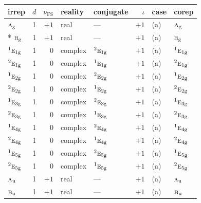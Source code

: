 \documentclass[10pt,a4paper]{article}
\numberwithin{equation}{section}
\newcommand{\irr}[1]{\text{\normalfont\scshape #1}}
\newcommand{\conjpair}[1]{{}^{#1}}
\newcommand{\ptag}[1]{\mathrm{#1}}
\newcommand{\fsind}{\nu_{\mathrm{FS}}}
\begin{document}
{\small\renewcommand{\arraystretch}{1.25}\setlength{\tabcolsep}{4pt}\begin{longtable}{@{}lrrllrll@{}}\toprule
irrep & $d$ & $\fsind$ & reality & conjugate & $\iota$ & case & corep\\\midrule\endhead
\bottomrule\endfoot\endlastfoot
$\irr{a}_{\ptag{g}}$ & 1 & $+1$ & real & --- & $+1$ & (a) & $\irr{a}_{\ptag{g}}$\\*
$\irr{b}_{\ptag{g}}$ & 1 & $+1$ & real & --- & $+1$ & (a) & $\irr{b}_{\ptag{g}}$\\
$\conjpair{1}\irr{e}_{1\ptag{g}}$ & 1 & $0$ & complex & $\conjpair{2}\irr{e}_{1\ptag{g}}$ & $+1$ & (a) & $\conjpair{1}\irr{e}_{1\ptag{g}}$\\
$\conjpair{2}\irr{e}_{1\ptag{g}}$ & 1 & $0$ & complex & $\conjpair{1}\irr{e}_{1\ptag{g}}$ & $+1$ & (a) & $\conjpair{2}\irr{e}_{1\ptag{g}}$\\
$\conjpair{1}\irr{e}_{2\ptag{g}}$ & 1 & $0$ & complex & $\conjpair{2}\irr{e}_{2\ptag{g}}$ & $+1$ & (a) & $\conjpair{1}\irr{e}_{2\ptag{g}}$\\
$\conjpair{2}\irr{e}_{2\ptag{g}}$ & 1 & $0$ & complex & $\conjpair{1}\irr{e}_{2\ptag{g}}$ & $+1$ & (a) & $\conjpair{2}\irr{e}_{2\ptag{g}}$\\
$\conjpair{1}\irr{e}_{3\ptag{g}}$ & 1 & $0$ & complex & $\conjpair{2}\irr{e}_{3\ptag{g}}$ & $+1$ & (a) & $\conjpair{1}\irr{e}_{3\ptag{g}}$\\
$\conjpair{2}\irr{e}_{3\ptag{g}}$ & 1 & $0$ & complex & $\conjpair{1}\irr{e}_{3\ptag{g}}$ & $+1$ & (a) & $\conjpair{2}\irr{e}_{3\ptag{g}}$\\
$\conjpair{1}\irr{e}_{4\ptag{g}}$ & 1 & $0$ & complex & $\conjpair{2}\irr{e}_{4\ptag{g}}$ & $+1$ & (a) & $\conjpair{1}\irr{e}_{4\ptag{g}}$\\
$\conjpair{2}\irr{e}_{4\ptag{g}}$ & 1 & $0$ & complex & $\conjpair{1}\irr{e}_{4\ptag{g}}$ & $+1$ & (a) & $\conjpair{2}\irr{e}_{4\ptag{g}}$\\
$\conjpair{1}\irr{e}_{5\ptag{g}}$ & 1 & $0$ & complex & $\conjpair{2}\irr{e}_{5\ptag{g}}$ & $+1$ & (a) & $\conjpair{1}\irr{e}_{5\ptag{g}}$\\
$\conjpair{2}\irr{e}_{5\ptag{g}}$ & 1 & $0$ & complex & $\conjpair{1}\irr{e}_{5\ptag{g}}$ & $+1$ & (a) & $\conjpair{2}\irr{e}_{5\ptag{g}}$\\
$\irr{a}_{\ptag{u}}$ & 1 & $+1$ & real & --- & $+1$ & (a) & $\irr{a}_{\ptag{u}}$\\
$\irr{b}_{\ptag{u}}$ & 1 & $+1$ & real & --- & $+1$ & (a) & $\irr{b}_{\ptag{u}}$\\

\end{longtable}}
\end{document}
